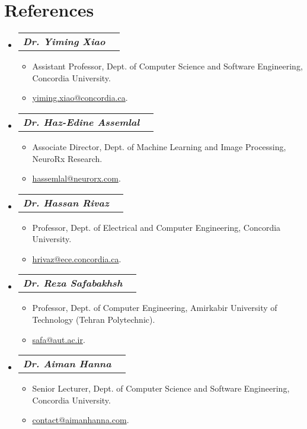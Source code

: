 \documentclass[letterpaper,11pt]{article}
\makeatletter
\newcommand{\resumeSubItem}[1]{
  \item\small{
    {#1 \vspace{-2pt}}
  }
}
\newcommand{\resumeSubheading}[2]{
  \vspace{-2pt}\item
    \begin{tabular*}{0.983\textwidth}[t]{l@{\extracolsep{\fill}}r}
      \textbf{\textit{#1}} & \small #2 
    \end{tabular*}\vspace{-7pt}
}
\newcommand{\resumeSubHeadingListStart}{\begin{itemize}[leftmargin=9pt]}
\newcommand{\resumeSubHeadingListEnd}{\end{itemize}}
\newcommand{\resumeSubItemListStart}{\begin{itemize}[leftmargin=17pt]}
\newcommand{\resumeSubItemListEnd}{\end{itemize}\vspace{-5pt}}
\makeatother
\begin{document}
\section{References}
    \resumeSubHeadingListStart
        \resumeSubheading{Dr. Yiming Xiao}{}
                \resumeSubItemListStart
                    \resumeSubItem{Assistant Professor, Dept. of Computer Science and Software Engineering, Concordia University.}
                    \resumeSubItem{\href{mailto:yiming.xiao@concordia.ca}{yiming.xiao@concordia.ca}.}
                \resumeSubItemListEnd
        \resumeSubheading{Dr. Haz-Edine Assemlal}{}
                \resumeSubItemListStart
                    \resumeSubItem{Associate Director, Dept. of Machine Learning and Image Processing, NeuroRx Research.}
                    \resumeSubItem{\href{mailto:hassemlal@neurorx.com}{hassemlal@neurorx.com}.}
                \resumeSubItemListEnd
        \resumeSubheading{Dr. Hassan Rivaz}{}
                \resumeSubItemListStart
                    \resumeSubItem{Professor, Dept. of Electrical and Computer Engineering, Concordia University.}
                    \resumeSubItem{\href{mailto:hrivaz@ece.concordia.ca}{hrivaz@ece.concordia.ca}.}
                \resumeSubItemListEnd
        \resumeSubheading{Dr. Reza Safabakhsh}{}
                \resumeSubItemListStart
                    \resumeSubItem{Professor, Dept. of Computer Engineering, Amirkabir University of Technology (Tehran Polytechnic).}
                    \resumeSubItem{\href{mailto:safa@aut.ac.ir}{safa@aut.ac.ir}.}
                \resumeSubItemListEnd
        \resumeSubheading{Dr. Aiman Hanna}{}
                \resumeSubItemListStart
                    \resumeSubItem{Senior Lecturer, Dept. of Computer Science and Software Engineering, Concordia University.}
                    \resumeSubItem{\href{mailto:contact@aimanhanna.com}{contact@aimanhanna.com}.}
                \resumeSubItemListEnd
    \resumeSubHeadingListEnd
    
\end{document}
